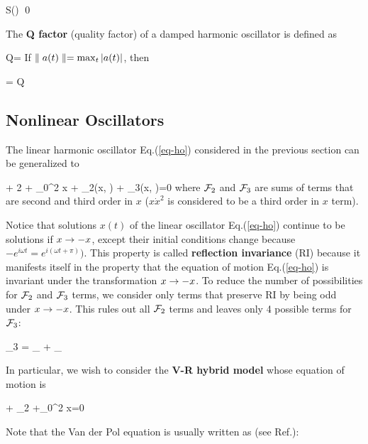 \beq
S(\nu)\approx 
{}
\eeq
\qed

The {\bf Q factor} (quality factor) of a damped harmonic oscillator is defined as

\beq
Q= 
\eeq
If $\parallel a(t)\parallel=\max_t|a(t)|$, then

\beq
{}
\approx
{}
=
Q
\eeq


\subsection{Nonlinear Oscillators}
The linear harmonic oscillator
Eq.(\ref{eq-ho})
considered in the previous
section can be
generalized to
 
\beq
{} + 2\gamma {} + \omega_0^2 x + \calf_2(x, )  + \calf_3(x, )=0
\eeq
where ${\cal F}_2$ and ${\cal F}_3$ are sums of terms  that are second and third order in $x$ ($x\dot{x}^2$ is
considered to be a third order in $x$ term).

Notice that solutions $x(t)$
of the linear oscillator
Eq.(\ref{eq-ho})
continue to be solutions if $x\rightarrow -x$, except their initial conditions change because $-e^{i\omega t}= e^{i(\omega t +\pi)})$.
This property is called {\bf
reflection invariance} (RI)
because it manifests itself in the property that the equation
of motion Eq.(\ref{eq-ho})
is invariant under the
transformation $x\rightarrow -x$.
To reduce the number of possibilities for ${\cal F}_2$ and
${\cal F}_3$ terms, we
consider only terms that 
preserve RI by being odd under
$x\rightarrow -x$.
This rules out all ${\cal F}_2$ terms
and leaves only 4 possible terms for ${\cal F}_3$:

\beq 
\calf_3 = _{}
+ _{}
\eeq

In particular,
we wish to consider the {\bf V-R hybrid model}
whose equation of motion is

\beq
{} + _{2\TIL{\gamma}}
 +\omega_0^2 x=0
\eeq

Note that the Van der Pol equation is usually written as
(see Ref.\cite{wiki-van-der-pol}):

